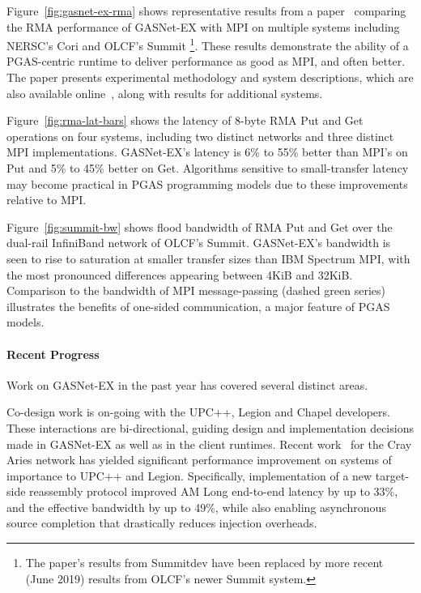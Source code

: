 Figure~\ref{fig:gasnet-ex-rma} shows representative results from a
paper~\cite{gasnet-lcpc18} comparing
the RMA performance of GASNet-EX with MPI on multiple systems including
NERSC's Cori and OLCF's Summit%
\footnote{The paper's results from Summitdev
have been replaced by more recent (June 2019) results from OLCF's newer Summit system.}.
These results demonstrate the ability of a PGAS-centric runtime to
deliver performance as good as MPI, and often better.
%
The paper presents experimental methodology and system descriptions, which are
also available online~\cite{gasnet-site}, along with results for additional
systems.

Figure~\ref{fig:rma-lat-bars} shows the latency of 8-byte RMA Put and Get operations on
four systems, including two distinct networks and three distinct MPI
implementations.
%
GASNet-EX's latency is 6\% to 55\% better than MPI's on Put and 5\% to 45\%
better on Get.
%
Algorithms sensitive to small-transfer latency may become practical in PGAS
programming models due to these improvements relative to MPI.

Figure~\ref{fig:summit-bw} shows flood bandwidth of RMA Put and Get over the
dual-rail InfiniBand network of OLCF's Summit.
GASNet-EX's bandwidth is seen to rise to saturation at smaller
transfer sizes than IBM Spectrum MPI, with the most pronounced differences
appearing between 4KiB and 32KiB.
%
Comparison to the bandwidth of MPI message-passing (dashed green series) illustrates the
benefits of one-sided communication, a major feature of PGAS models.


\paragraph{Recent Progress}

Work on GASNet-EX in the past year has covered several distinct areas.

Co-design work is on-going with the UPC++, Legion and Chapel developers.  These
interactions are bi-directional, guiding design and implementation decisions
made in GASNet-EX as well as in the client runtimes.
%
Recent work~\cite{gasnet-reassembly} for the Cray Aries network has yielded
significant performance improvement on systems of importance to UPC++ and Legion.
Specifically, implementation of a new target-side reassembly protocol improved
AM Long end-to-end latency by up to 33\%, and the effective bandwidth by up to
49\%, while also enabling asynchronous source completion that drastically reduces
injection overheads.

